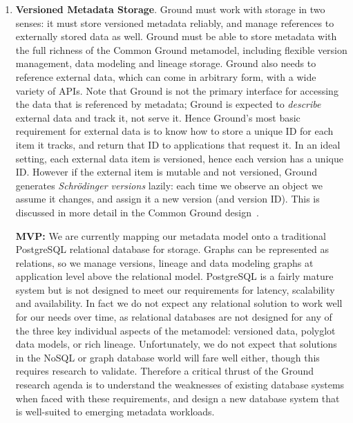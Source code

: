 \begin{enumerate}
\item \textbf{Versioned Metadata Storage}.  Ground must work with storage in two senses: it must store versioned metadata reliably, and manage references to externally stored data as well.  Ground must be able to store metadata with the full richness of the Common Ground metamodel, including flexible version management, data modeling and lineage storage.  Ground also needs to reference external data, which can come in arbitrary form, with a wide variety of APIs.  Note that Ground is not the primary interface for accessing the data that is referenced by metadata; Ground is expected to \emph{describe} external data and track it, not serve it.  Hence Ground's most basic requirement for external data is to know how to store a unique ID for each item it tracks, and return that ID to applications that request it.  In an ideal setting, each external data item is versioned, hence each version has a unique ID.  However if the external item is mutable and not versioned, Ground generates \emph{Schr\"{o}dinger versions} lazily: each time we observe an object we assume it changes, and assign it a new version (and version ID).  This is discussed in more detail in the Common Ground design~\cite{ground-metamodel}.

\textbf{MVP:} We are currently mapping our metadata model onto a traditional PostgreSQL relational database for storage.  Graphs can be represented as relations, so we manage versions, lineage and data modeling graphs at application level above the relational model.  PostgreSQL is a fairly mature system but is not designed to meet our requirements for latency, scalability and availability. In fact we do not expect any relational solution to work well for our needs over time, as relational databases are not designed for any of the three key individual aspects of the metamodel: versioned data, polyglot data models, or rich lineage.  Unfortunately, we do not expect that solutions in the NoSQL or graph database world will fare well either, though this requires research to validate. Therefore a critical thrust of the Ground research agenda is to understand the weaknesses of existing database systems when faced with these requirements, and design a new database system that is well-suited to emerging metadata workloads. 



\end{enumerate}
